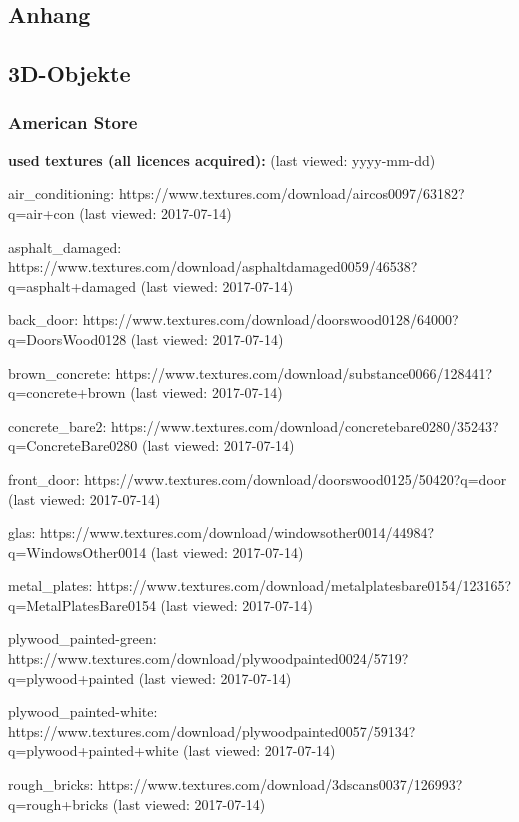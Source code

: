 \documentclass{Paper}
\begin{document}
\newpage

\printbibliography

\begin{appendix}
\section{Anhang}

\subsection{3D-Objekte}

\subsubsection{American Store}

\textbf{used textures (all licences acquired):}
(last viewed: yyyy-mm-dd)

air\_conditioning:
https://www.textures.com/download/aircos0097/63182?q=air+con
(last viewed: 2017-07-14)

asphalt\_damaged:
https://www.textures.com/download/asphaltdamaged0059/46538?q=asphalt+damaged
(last viewed: 2017-07-14)

back\_door:
https://www.textures.com/download/doorswood0128/64000?q=DoorsWood0128
(last viewed: 2017-07-14)

brown\_concrete:
https://www.textures.com/download/substance0066/128441?q=concrete+brown
(last viewed: 2017-07-14)

concrete\_bare2:
https://www.textures.com/download/concretebare0280/35243?q=ConcreteBare0280
(last viewed: 2017-07-14)

front\_door:
https://www.textures.com/download/doorswood0125/50420?q=door
(last viewed: 2017-07-14)

glas:
https://www.textures.com/download/windowsother0014/44984?q=WindowsOther0014
(last viewed: 2017-07-14)

metal\_plates:
https://www.textures.com/download/metalplatesbare0154/123165?q=MetalPlatesBare0154
(last viewed: 2017-07-14)

plywood\_painted-green:
https://www.textures.com/download/plywoodpainted0024/5719?q=plywood+painted
(last viewed: 2017-07-14)

plywood\_painted-white:
https://www.textures.com/download/plywoodpainted0057/59134?q=plywood+painted+white
(last viewed: 2017-07-14)

rough\_bricks:
https://www.textures.com/download/3dscans0037/126993?q=rough+bricks
(last viewed: 2017-07-14)


\end{appendix}
\end{document}
